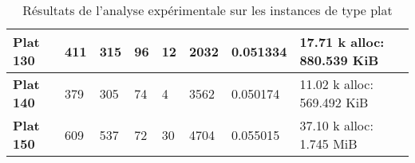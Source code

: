 \begin{table}[]
\begin{tabular}{|l|l|l|l|l|l|l|l|}
\textbf{Plat 130}                                   & 411                                                      & 315                                                        & 96                                                        & 12                                                                                                                                    & 2032                                                                                                                  & 0.051334                                                                                                           & 17.71 k alloc: 880.539 KiB                         \\ \hline
\textbf{Plat 140}                                   & 379                                                      & 305                                                        & 74                                                        & 4                                                                                                                                     & 3562                                                                                                                  & 0.050174                                                                                                           & 11.02 k alloc: 569.492 KiB                         \\ \hline
\textbf{Plat 150}                                   & 609                                                      & 537                                                        & 72                                                        & 30                                                                                                                                    & 4704                                                                                                                  & 0.055015                                                                                                           & 37.10 k alloc: 1.745 MiB                           \\ \hline
\end{tabular}
\caption{Résultats de l'analyse expérimentale sur les instances de type plat}
\end{table}
